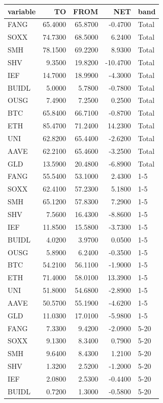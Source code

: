 \begin{tabular}{lrrrl}
\toprule
variable & TO & FROM & NET & band \\
\midrule
FANG & 65.4000 & 65.8700 & -0.4700 & Total \\
SOXX & 74.7300 & 68.5000 & 6.2400 & Total \\
SMH & 78.1500 & 69.2200 & 8.9300 & Total \\
SHV & 9.3500 & 19.8200 & -10.4700 & Total \\
IEF & 14.7000 & 18.9900 & -4.3000 & Total \\
BUIDL & 5.0000 & 5.7800 & -0.7800 & Total \\
OUSG & 7.4900 & 7.2500 & 0.2500 & Total \\
BTC & 65.8400 & 66.7100 & -0.8700 & Total \\
ETH & 85.4700 & 71.2400 & 14.2300 & Total \\
UNI & 62.8200 & 65.4400 & -2.6200 & Total \\
AAVE & 62.2100 & 65.4600 & -3.2500 & Total \\
GLD & 13.5900 & 20.4800 & -6.8900 & Total \\
FANG & 55.5400 & 53.1000 & 2.4300 & 1-5 \\
SOXX & 62.4100 & 57.2300 & 5.1800 & 1-5 \\
SMH & 65.1200 & 57.8300 & 7.2900 & 1-5 \\
SHV & 7.5600 & 16.4300 & -8.8600 & 1-5 \\
IEF & 11.8500 & 15.5800 & -3.7300 & 1-5 \\
BUIDL & 4.0200 & 3.9700 & 0.0500 & 1-5 \\
OUSG & 5.8900 & 6.2400 & -0.3500 & 1-5 \\
BTC & 54.2100 & 56.1100 & -1.9000 & 1-5 \\
ETH & 71.4000 & 58.0100 & 13.3900 & 1-5 \\
UNI & 51.8000 & 54.6800 & -2.8900 & 1-5 \\
AAVE & 50.5700 & 55.1900 & -4.6200 & 1-5 \\
GLD & 11.0300 & 17.0100 & -5.9800 & 1-5 \\
FANG & 7.3300 & 9.4200 & -2.0900 & 5-20 \\
SOXX & 9.1300 & 8.3400 & 0.7900 & 5-20 \\
SMH & 9.6400 & 8.4300 & 1.2100 & 5-20 \\
SHV & 1.3200 & 2.5200 & -1.2000 & 5-20 \\
IEF & 2.0800 & 2.5300 & -0.4400 & 5-20 \\
BUIDL & 0.7200 & 1.3000 & -0.5800 & 5-20 \\

\end{tabular}
